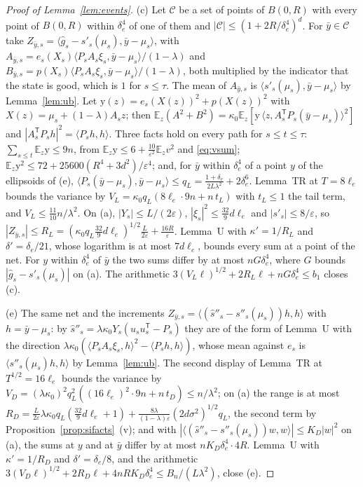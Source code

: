 \documentclass[11pt]{amsart}
\theoremstyle{definition}
\numberwithin{equation}{section}
\newcommand{\E}{\mathbb{E}}
\newcommand{\ip}[1]{\langle #1\rangle}
\begin{document}
\begin{proof}[Proof of Lemma~\ref{lem:events}]
(c) Let $\mathcal C$ be a set of points of $B(0,R)$ with every point of $B(0,R)$ within $\delta_e^4$ of one of them and $|\mathcal C|\le(1+2R/\delta_e^4)^d$. For $\bar y\in\mathcal C$ take $Z_{\bar y,s}=\ip{\hat g_s-s'_s(\mu_s),\bar y-\mu_s}$, with $A_{\bar y,s}=e_s(X_s)\ip{P_sA_s\xi_s,\bar y-\mu_s}/(1-\lambda)$ and $B_{\bar y,s}=p(X_s)\ip{P_sA_s\xi_s,\bar y-\mu_s}/(1-\lambda)$, both multiplied by the indicator that the state is good, which is $1$ for $s\le\tau$. The mean of $A_{\bar y,s}$ is $\ip{s'_s(\mu_s),\bar y-\mu_s}$ by Lemma~\ref{lem:ub}. Let $\mathrm y(z)=e_s(X(z))^2+p(X(z))^2$ with $X(z)=\mu_s+(1-\lambda)A_sz$; then $\E_z(A^2+B^2)=\kappa_0\E_z[\mathrm y\,\ip{z,A_s^{\mathsf T}P_s(\bar y-\mu_s)}^2]$ and $|A_s^{\mathsf T}P_sh|^2=\ip{P_sh,h}$. Three facts hold on every path for $s\le t\le\tau$: $\sum_{s\le t}\E_z\mathrm y\le9n$, from $\E_z\mathrm y\le6+\frac{10}{\varepsilon^2}\E_zv^2$ and \eqref{eq:vsum}; $\E_z\mathrm y^2\le72+25600(R^4+3d^2)/\varepsilon^4$; and, for $\bar y$ within $\delta_e^4$ of a point $y$ of the ellipsoids of (e), $\ip{P_s(\bar y-\mu_s),\bar y-\mu_s}\le q_L=\frac{1+\delta_e}{2L\lambda^2}+2\delta_e^6$. Lemma~TR at $T=8\ell_e$ bounds the variance by $V_L=\kappa_0q_L(8\ell_e\cdot9n+n\,t_L)$ with $t_L\le1$ the tail term, and $V_L\le\frac{11}{10}n/\lambda^2$. On (a), $|Y_s|\le L/(2\varepsilon)$, $|\xi_s|^2\le\frac{32}9d\ell_e$ and $|s'_s|\le8/\varepsilon$, so $|Z_{\bar y,s}|\le R_L=(\kappa_0q_L\frac{32}9d\ell_e)^{1/2}\frac L{2\varepsilon}+\frac{16R}\varepsilon$. Lemma~U with $\kappa'=1/R_L$ and $\delta'=\delta_e/21$, whose logarithm is at most $7d\ell_e$, bounds every sum at a point of the net. For $y$ within $\delta_e^4$ of $\bar y$ the two sums differ by at most $nG\delta_e^4$, where $G$ bounds $|\hat g_s-s'_s(\mu_s)|$ on (a). The arithmetic $3(V_L\ell)^{1/2}+2R_L\ell+nG\delta_e^4\le b_1$ closes (c).

(e) The same net and the increments $Z_{\bar y,s}=\ip{(\hat s''_s-s''_s(\mu_s))h,h}$ with $h=\bar y-\mu_s$: by $\hat s''_s=\lambda\kappa_0Y_s(u_su_s^{\mathsf T}-P_s)$ they are of the form of Lemma~U with the direction $\lambda\kappa_0(\ip{P_sA_s\xi_s,h}^2-\ip{P_sh,h})$, whose mean against $e_s$ is $\ip{s''_s(\mu_s)h,h}$ by Lemma~\ref{lem:ub}. The second display of Lemma~TR at $T^{1/2}=16\ell_e$ bounds the variance by $V_D=(\lambda\kappa_0)^2q_L^2((16\ell_e)^2\cdot9n+n\,t_D)\le n/\lambda^2$; on (a) the range is at most $R_D=\frac L{2\varepsilon}\lambda\kappa_0q_L(\frac{32}9d\ell_e+1)+\frac{8\lambda}{(1-\lambda)\varepsilon}(2d\sigma^2)^{1/2}q_L$, the second term by Proposition~\ref{prop:sifacts}~(v); and with $|\ip{(\hat s''_s-s''_s(\mu_s))w,w}|\le K_D|w|^2$ on (a), the sums at $y$ and at $\bar y$ differ by at most $nK_D\delta_e^4\cdot4R$. Lemma~U with $\kappa'=1/R_D$ and $\delta'=\delta_e/8$, and the arithmetic $3(V_D\ell)^{1/2}+2R_D\ell+4nRK_D\delta_e^4\le B_n/(L\lambda^2)$, close (e).


\end{proof}
\end{document}
